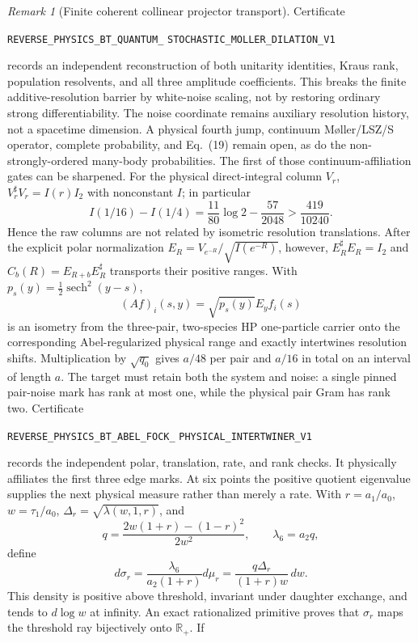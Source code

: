 \documentclass[11pt]{article}
\theoremstyle{definition}
\theoremstyle{remark}
\newtheorem{remark}[theorem]{Remark}
\begin{document}
\begin{remark}[Finite coherent collinear projector transport]
Certificate
\par\noindent
\texttt{REVERSE\_PHYSICS\_BT\_QUANTUM\_}
\allowbreak\texttt{STOCHASTIC\_MOLLER\_DILATION\_V1}
\par\noindent
records an independent reconstruction of both unitarity identities, Kraus
rank, population resolvents, and all three amplitude coefficients.  This
breaks the finite additive-resolution barrier by white-noise scaling, not by
restoring ordinary strong differentiability.  The noise coordinate remains
auxiliary resolution history, not a spacetime dimension.  A physical fourth
jump, continuum M\o ller/LSZ/S operator, complete probability, and Eq.~(19)
remain open, as do the non-strongly-ordered many-body probabilities.
The first of those continuum-affiliation gates can be sharpened.  For the
physical direct-integral column $V_r$,
$V_r^\sharp V_r=I(r)I_2$ with nonconstant $I$; in particular
\[
 I(1/16)-I(1/4)=\frac{11}{80}\log2-\frac{57}{2048}
 >\frac{419}{10240}.
\]
Hence the raw columns are not related by isometric resolution translations.
After the explicit polar normalization
$E_R=V_{e^{-R}}/\sqrt{I(e^{-R})}$, however,
$E_R^\sharp E_R=I_2$ and
$C_b(R)=E_{R+b}E_R^\sharp$ transports their positive ranges.  With
$p_s(y)=\tfrac12\operatorname{sech}^2(y-s)$,
\[
 (Af)_i(s,y)=\sqrt{p_s(y)}E_yf_i(s)
\]
is an isometry from the three-pair, two-species HP one-particle carrier onto
the corresponding Abel-regularized physical range and exactly intertwines
resolution shifts.  Multiplication by $\sqrt{q_0}$ gives $a/48$ per pair and
$a/16$ in total on an interval of length $a$.  The target must retain both the
system and noise: a single pinned pair-noise mark has rank at most one, while
the physical pair Gram has rank two.  Certificate
\par\noindent
\texttt{REVERSE\_PHYSICS\_BT\_ABEL\_FOCK\_}
\allowbreak\texttt{PHYSICAL\_INTERTWINER\_V1}
\par\noindent
records the independent polar, translation, rate, and rank checks.  It
physically affiliates the first three edge marks.  At six points the positive
quotient eigenvalue supplies the next physical measure rather than merely a
rate.  With $r=a_1/a_0$, $w=\tau_1/a_0$,
$\Delta_r=\sqrt{\lambda(w,1,r)}$, and
\[
 q=\frac{2w(1+r)-(1-r)^2}{2w^2},
 \qquad \lambda_6=a_2q,
\]
define
\[
 d\sigma_r=\frac{\lambda_6}{a_2(1+r)}d\mu_r
 =\frac{q\Delta_r}{(1+r)w}\,dw.
\]
This density is positive above threshold, invariant under daughter exchange,
and tends to $d\log w$ at infinity.  An exact rationalized primitive proves
that $\sigma_r$ maps the threshold ray bijectively onto $\mathbb R_+$.  If

\end{remark}
\end{document}

